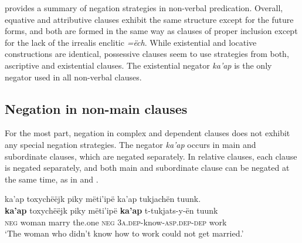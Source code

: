 \documentclass[output=paper,colorlinks,citecolor=brown,draft]{langscibook}
\begin{document}
 provides a summary of negation strategies in non-verbal predication. Overall, equative and attributive clauses exhibit the same structure except for the future forms, and both are formed in the same way as clauses of proper inclusion except for the lack of the irrealis enclitic \textit{=ëch}. While existential and locative constructions are identical, possessive clauses seem to use strategies from both, ascriptive and existential clauses. The existential negator \textit{ka’ap} is the only negator used in all non-verbal clauses.


\subsection{Negation in non-main clauses}\label{sec:mix:2.4}
For the most part, negation in complex and dependent clauses does not exhibit any special negation strategies. The negator \textit{ka’ap} occurs in main and subordinate clauses, which are negated separately. In relative clauses, each clause is negated separately, and both main and subordinate clause can be negated at the same time, as in  and .

\ea\label{ex:mix:82}
    \glll ka’ap toxychëëjk piky {\ob}mëti’ipë ka’ap tukjachën tuunk{\cb}. \\ 
        \textbf{ka’ap} toxychëëjk piky {\db}mëti’ipë \textbf{ka’ap} t-tukjats-y-ën tuunk  \\
        \textsc{neg} woman marry the.one \textsc{neg} 3\textsc{a.dep}{}-know-\textsc{asp.dep-dep} work \\
    \glt ‘The woman who didn’t know how to work could not get married.’
\z
\end{document}
